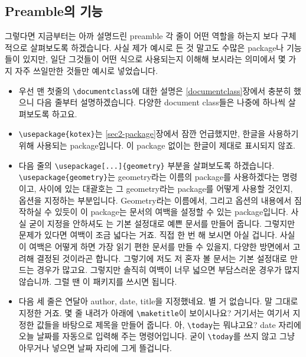 \subsection{Preamble의 기능}
\label{sec:text-preamble}
그렇다면 지금부터는 아까 설명드린 preamble 각 줄이 어떤 역할을 하는지 보다 구체적으로 살펴보도록 하겠습니다.
사실 제가 예시로 든 것 말고도 수많은 package나 기능들이 있지만, 일단 그것들이 어떤 식으로 사용되는지 이해해 보시라는 의미에서 몇 가지 자주 쓰일만한 것들만 예시로 넣었습니다.
\begin{itemize}
  \item 우선 맨 첫줄의 \verb|\documentclass|에 대한 설명은 \ref{documentclass}장에서 충분히 했으니 다음 줄부터 설명하겠습니다. 다양한 document class들은 나중에 하나씩 살펴보도록 하고요.

  \item \verb|\usepackage{kotex}|는 \ref{sec2-package}장에서 잠깐 언급했지만, 한글을 사용하기 위해 사용되는 package입니다. 이 package 없이는 한글이 제대로 표시되지 않죠.

  \item 다음 줄의 \verb|\usepackage[...]{geometry}| 부분을 살펴보도록 하겠습니다. \verb|\usepackage{geometry}|는 geometry라는 이름의 package를 사용하겠다는 명령이고, 사이에 있는 대괄호는 그 geometry라는 package를 어떻게 사용할 것인지, 옵션을 지정하는 부분입니다. Geometry라는 이름에서, 그리고 옵션의 내용에서 짐작하실 수 있듯이 이 package는 문서의 여백을 설정할 수 있는 package입니다. 사실 굳이 지정을 안하셔도 \lt 는 기본 설정대로 예쁜 문서를 만들어 줍니다. 그렇지만 문제가 있다면 여백이 조금 넓다는 거죠. 직접 한 번 해 보시면 아실 겁니다. 사실 이 여백은 어떻게 하면 가장 읽기 편한 문서를 만들 수 있을지, 다양한 방면에서 고려해 결정된 것이라곤 합니다. 그렇기에 저도 저 혼자 볼 문서는 기본 설정대로 만드는 경우가 많고요. 그렇지만 솔직히 여백이 너무 넓으면 부담스러운 경우가 많지 않습니까. 그럴 땐 이 패키지를 쓰시면 됩니다.
    
  \item 다음 세 줄은 연달아 author, date, title을 지정했네요. 별 거 없습니다. 말 그대로 지정한 거죠. 몇 줄 내려가 \verb||아래에 \verb|\maketitle|이 보이시나요? 거기서는 여기서 지정한 값들을 바탕으로 제목을 만들어 줍니다. 아, \verb|\today|는 뭐냐고요? date 자리에 오늘 날짜를 자동으로 입력해 주는 명령어입니다. 굳이 \verb|\today|를 쓰지 않고 그냥 아무거나 넣으면 날짜 자리에 그게 뜰겁니다. 
\end{itemize}

